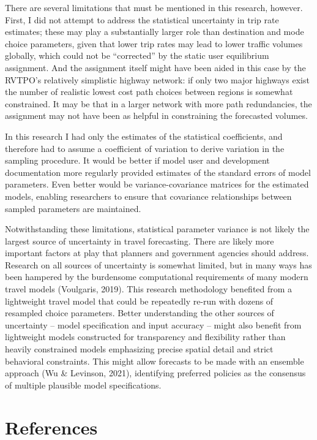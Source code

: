 \documentclass[fancy, masters]{byuthesis}
\begin{document}
There are several limitations that must be mentioned in this research, however. First, I did not attempt to address the statistical uncertainty in trip rate estimates; these may play a substantially larger role than destination and mode choice parameters, given that lower trip rates may lead to lower traffic volumes globally, which could not be ``corrected'' by the static user equilibrium assignment. And the assignment itself might have been aided in this case by the RVTPO's relatively simplistic highway network: if only two major highways exist the number of realistic lowest cost path choices between regions is somewhat constrained. It may be that in a larger network with more path redundancies, the assignment may not have been as helpful in constraining the forecasted volumes.

In this research I had only the estimates of the statistical coefficients, and therefore had to assume a coefficient of variation to derive variation in the sampling procedure. It would be better if model user and development documentation more regularly provided estimates of the standard errors of model parameters. Even better would be variance-covariance matrices for the estimated models, enabling researchers to ensure that covariance relationships between sampled parameters are maintained.

Notwithstanding these limitations, statistical parameter variance is not likely the largest source of uncertainty in travel forecasting. There are likely more important factors at play that planners and government agencies should address. Research on all sources of uncertainty is somewhat limited, but in many ways has been hampered by the burdensome computational requirements of many modern travel models (Voulgaris, 2019). This research methodology benefited from a lightweight travel model that could be repeatedly re-run with dozens of resampled choice parameters. Better understanding the other sources of uncertainty -- model specification and input accuracy -- might also benefit from lightweight models constructed for transparency and flexibility rather than heavily constrained models emphasizing precise spatial detail and strict behavioral constraints. This might allow forecasts to be made with an ensemble approach (Wu \& Levinson, 2021), identifying preferred policies as the consensus of multiple plausible model specifications.

\hypertarget{references}{%
\chapter*{References}\label{references}}
\end{document}
